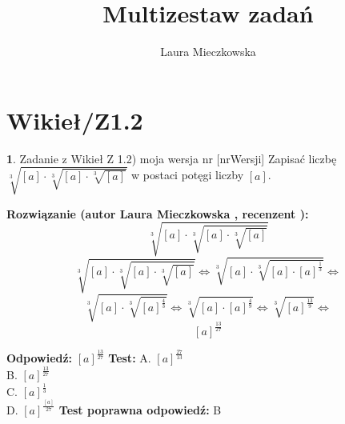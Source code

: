 \documentclass[12pt, a4paper]{article}
\title{Multizestaw zadań}
\author{Laura Mieczkowska}
\date{}
\theoremstyle{definition} %
\newtheorem{zad}{}
\newcommand{\kategoria}[1]{\section{#1}} %
\newcommand{\zadStart}[1]{\begin{zad}#1\newline} %
\newcommand{\zadStop}{\end{zad}}   %
\newcommand{\rozwStart}[2]{\noindent \textbf{Rozwiązanie (autor #1 , recenzent #2): }\newline} %
\newcommand{\odpStart}{\noindent \textbf{Odpowiedź:}\newline}    %
\newcommand{\odpStop}{\newline}                                             %
\newcommand{\testStart}{\noindent \textbf{Test:}\newline} %
\newcommand{\testStop}{\newline} %
\newcommand{\kluczStart}{\noindent \textbf{Test poprawna odpowiedź:}\newline} %
\newcommand{\kluczStop}{\newline} %
\begin{document}
\maketitle


\kategoria{Wikieł/Z1.2}
\zadStart{Zadanie z Wikieł Z 1.2) moja wersja nr [nrWersji]}
Zapisać liczbę $\sqrt[3]{[a]\cdot\sqrt[3]{[a]\cdot\sqrt[3]{[a]}}}$ w postaci potęgi liczby $[a]$.
\zadStop
\rozwStart{Laura Mieczkowska}{}
$$\sqrt[3]{[a]\cdot\sqrt[3]{[a]\cdot\sqrt[3]{[a]}}}$$ 
$$\sqrt[3]{[a]\cdot\sqrt[3]{[a]\cdot\sqrt[3]{[a]}}} \Leftrightarrow \sqrt[3]{[a]\cdot\sqrt[3]{[a]\cdot[a]^{\frac{1}{3}}}}\Leftrightarrow $$
$$\sqrt[3]{[a]\cdot\sqrt[3]{[a]^{\frac{4}{3}}}} \Leftrightarrow \sqrt[3]{[a]\cdot[a]^{\frac{4}{9}}}\Leftrightarrow \sqrt[3]{[a]^{\frac{13}{9}}} \Leftrightarrow$$
$$[a]^{\frac{13}{27}}$$


\odpStart
$[a]^{\frac{13}{27}}$
\odpStop
\testStart
A. $[a]^{\frac{27}{13}}$ \\
B. $[a]^{\frac{13}{27}}$ \\
C. $[a]^{\frac{1}{3}}$ \\
D. $[a]^{\frac{[a]}{27}}$ 
\testStop
\kluczStart
B
\kluczStop
\end{document}
